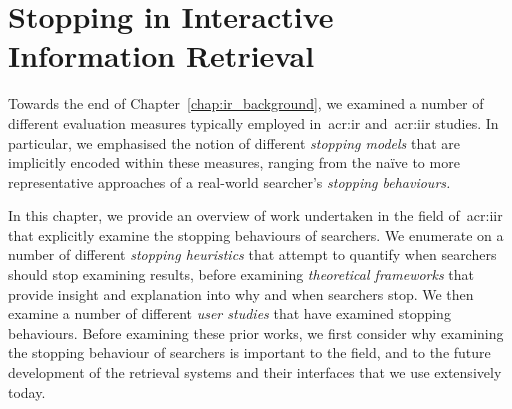 
\chapter[A Background of Stopping in IIR]{Stopping in Interactive\\Information Retrieval}\label{chap:stopping_background}
Towards the end of Chapter~\ref{chap:ir_background}, we examined a number of different evaluation measures typically employed in~\gls{acr:ir} and~\gls{acr:iir} studies. In particular, we emphasised the notion of different \emph{stopping models} that are implicitly encoded within these measures, ranging from the na\"{i}ve to more representative approaches of a real-world searcher's \emph{stopping behaviours.}

\begin{figure}[h]
    \centering
    \vspace{4mm}
    \label{fig:stopsign}
    \vspace{-5mm}
\end{figure}

In this chapter, we provide an overview of work undertaken in the field of~\gls{acr:iir} that explicitly examine the stopping behaviours of searchers. We enumerate on a number of different \emph{stopping heuristics} that attempt to quantify when searchers should stop examining results, before examining \emph{theoretical frameworks} that provide insight and explanation into why and when searchers stop. We then examine a number of different \emph{user studies} that have examined stopping behaviours. Before examining these prior works, we first consider why examining the stopping behaviour of searchers is important to the field, and to the future development of the retrieval systems and their interfaces that we use extensively today.


